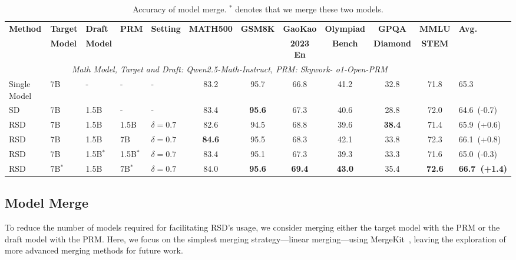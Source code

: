 \documentclass{article}
\theoremstyle{plain}
\theoremstyle{definition}
\theoremstyle{remark}
\begin{document}
\begin{table}[h!]
\caption{Accuracy of model merge. $^{*}$ denotes that we merge these two models.}
\label{tab:full_merge}
\vskip 0.1in
\scriptsize
\begin{center}
\begin{tabular}{lllllccccccl}
\toprule
\multirow{2}{*}{\textbf{Method}} & \textbf{Target} & \textbf{Draft} & \multirow{2}{*}{\textbf{PRM}} & \multirow{2}{*}{\textbf{Setting}} & \multirow{2}{*}{\textbf{MATH500}} & \multirow{2}{*}{\textbf{GSM8K}} & \textbf{GaoKao} &  \textbf{Olympiad} &  \textbf{GPQA} &  \textbf{MMLU} & \multirow{2}{*}{\textbf{Avg.}} \\
& \textbf{Model} & \textbf{Model} & & & & & \textbf{2023 En} &  \textbf{Bench} &  \textbf{Diamond} &  \textbf{STEM} \\
\midrule
\multicolumn{11}{c}{\textit{Math Model, Target and Draft: Qwen2.5-Math-Instruct, PRM: Skywork-
o1-Open-PRM}} \\
\midrule
Single Model & 7B & - & - & - & 83.2 & 95.7 & 66.8 & 41.2 & 32.8 & 71.8 & 65.3 \\
\cmidrule(lr){1-12}
SD & 7B & 1.5B & - & - & 83.4 & \textbf{95.6} & 67.3 & 40.6 & 28.8 & 72.0 & 64.6~(-0.7) \\
\rowcolor{blue!8}
RSD & 7B & 1.5B & 1.5B & $\delta=0.7$ & 82.6 & 94.5 & 68.8 & 39.6 & \textbf{38.4} & 71.4 & 65.9~(+0.6) \\
\rowcolor{blue!8}
RSD & 7B & 1.5B & 7B & $\delta=0.7$ & \textbf{84.6} & 95.5 & 68.3 & 42.1 & 33.8 & 72.3 & 66.1~(+0.8) \\
\rowcolor{orange!8}
RSD & 7B & 1.5B$^{*}$ & 1.5B$^{*}$ & $\delta=0.7$ & 83.4 & 95.1 & 67.3 & 39.3 & 33.3 & 71.6 & 65.0~(-0.3)\\
\rowcolor{orange!8}
RSD & 7B$^{*}$ & 1.5B & 7B$^{*}$ & $\delta=0.7$ & 84.0 & \textbf{95.6} & \textbf{69.4} & \textbf{43.0} & 35.4 & \textbf{72.6}  & \textbf{66.7~(+1.4)} \\
\bottomrule
\end{tabular}
\end{center}
\vskip -0.25in
\end{table}

\subsection{Model Merge}
\label{sec:merge}
To reduce the number of models required for facilitating RSD's usage, we consider merging either the target model with the PRM or the draft model with the PRM. Here, we focus on the simplest merging strategy—linear merging—using MergeKit~\citep{mergekit}, leaving the exploration of more advanced merging methods for future work.
\end{document}
